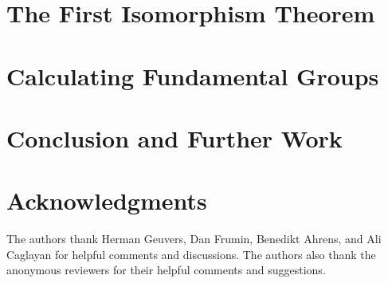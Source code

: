 \documentclass{lmcs}
\theoremstyle{plain}
\theoremstyle{definition}
\begin{document}
\section{The First Isomorphism Theorem}
\label{sec:isomorphism_theorem}


\section{Calculating Fundamental Groups}
\label{sec:fundamental_groups}


\section{Conclusion and Further Work}
\label{sec:conclusion}



\section*{Acknowledgments}
The authors thank Herman Geuvers, Dan Frumin, Benedikt Ahrens, and Ali Caglayan for helpful comments and discussions.
The authors also thank the anonymous reviewers for their helpful comments and suggestions.



\end{document}
